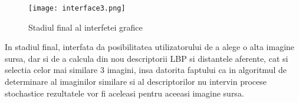 \begin{figure}[H]
	\texttt{[image: interface3.png]}
	\centering
	\caption{Stadiul final al interfetei grafice}
\end{figure}

In stadiul final, interfata da posibilitatea utilizatorului de a alege o alta imagine
sursa, dar si de a calcula din nou descriptorii LBP si distantele aferente, cat si selectia
celor mai similare 3 imagini, insa datorita faptului ca in algoritmul de determinare
al imaginilor similare si al descriptorilor nu intervin procese stochastice rezultatele vor
fi aceleasi pentru aceeasi imagine sursa.



